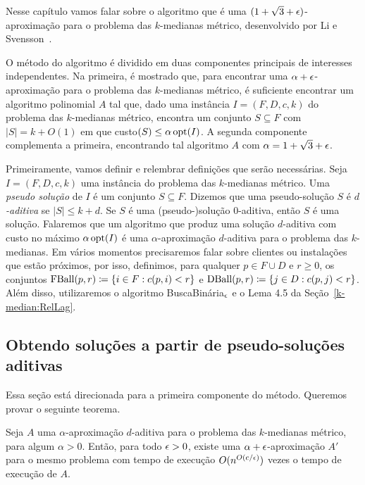 Nesse capítulo vamos falar sobre o algoritmo que é uma $(1 + \sqrt{3} + \epsilon)$-aproximação para o problema das $k$-medianas métrico, desenvolvido por Li e Svensson~\cite{li2012}.

O método do algoritmo é dividido em duas componentes principais de interesses independentes. Na primeira, é mostrado que, para encontrar uma $\alpha + \epsilon$-aproximação para o problema das $k$-medianas métrico, é suficiente encontrar um algoritmo polinomial $A$ tal que, dado uma instância $I = (F,D,c,k)$ do problema das $k$-medianas métrico, encontra um conjunto $S \subseteq F$ com $|S| = k + O(1)$ em que custo$(S) \leq \alpha \, \mathrm{opt}(I) $. A segunda componente complementa a primeira, encontrando tal algoritmo $A$ com ${\alpha =  1 + \sqrt{3} + \epsilon}$.

Primeiramente, vamos definir e relembrar definições que serão necessárias. Seja $I = (F,D,c,k)$ uma instância do problema das $k$-medianas métrico. Uma \emph{pseudo solução} de $I$ é um conjunto $S \subseteq F$. Dizemos que uma pseudo-solução $S$ é \emph{$d$-aditiva} se $|S| \leq k + d$. Se $S$ é uma (pseudo-)solução $0$-aditiva, então $S$ é uma solução. Falaremos que um algoritmo que produz uma solução $d$-aditiva com custo no máximo $\alpha\, \mathrm{opt}(I)$ é uma $\alpha$-aproximação $d$-aditiva para o problema das $k$-medianas.
Em vários momentos precisaremos falar sobre clientes ou instalações que estão próximos, por isso, definimos, para qualquer $p \in F \cup D$ e $r \geq 0$, os conjuntos ${\text{FBall}(p,r) \coloneq \{i \in F: c(p,i) < r\}}$ e ${\text{DBall}(p,r) \coloneqq \{j \in D: c(p,j) < r\}}$.
Além disso, utilizaremos o algoritmo {\sc BuscaBinária$_\epsilon$} e o Lema 4.5 da Seção~\ref{k-median:RelLag}.

\subsection{Obtendo soluções a partir de pseudo-soluções aditivas}

Essa seção está direcionada para a primeira componente do método. Queremos provar o seguinte teorema.

\begin{theorem}
    Seja $A$ uma $\alpha$-aproximação $d$-aditiva para o problema das $k$-medianas métrico, para algum $\alpha >0$. Então, para todo $\epsilon > 0$, existe uma $\alpha + \epsilon$-aproximação $A'$ para o mesmo problema com tempo de execução $O(n^{O(c/\epsilon)})$ vezes o tempo de execução de $A$.
\end{theorem}


